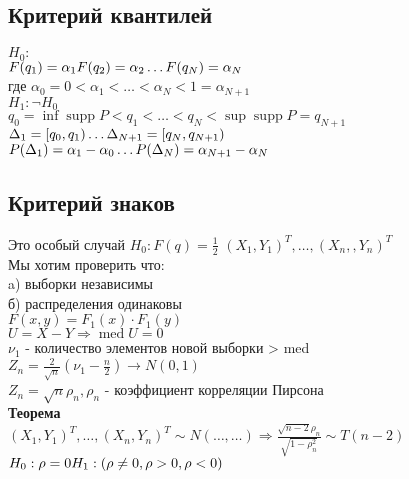 \documentclass{article}
\newcommand\0{\mathbb{0}}
\DeclareMathOperator{\supp}{supp}
\DeclareMathOperator{\med}{med}
\newcommand\1{\mathbb{1}}
\newcommand{\Rto}{\Rightarrow}
\begin{document}
\subsection{Критерий квантилей}
$H_0:$\\
$F(q_1) = \alpha_1\\
F(q_2) = \alpha_2\\
\dots \\
F(q_N) = \alpha_N$\\
где $\alpha_0 = 0 < \alpha_1 < \dots < \alpha_N < 1 = \alpha_{N + 1}$\\
$H_1: \neg H_0$\\
$q_0 = \inf \supp P < q_1 < \dots < q_N < \sup \supp P = q_{N + 1}$\\
$\Delta_1 = [q_0, q_1)\\
\dots\\
\Delta_{N + 1} = [q_N, q_{N + 1})$\\
$P(\Delta_1) = \alpha_1 - \alpha_0\\
\dots\\
P(\Delta_N) = \alpha_{N + 1} - \alpha_N$\\
\subsection{Критерий знаков}
Это особый случай $H_0: F(q) = \frac{1}{2}$
$(X_1, Y_1)^T, \dots, (X_n, , Y_n)^T$\\
Мы хотим проверить что:\\
a) выборки независимы\\
б) распределения одинаковы\\
$F(x, y) = F_1(x) \cdot F_1(y)$\\
$U = X - Y \Rto \med U = 0$\\
$\nu_1$ - количество элементов новой выборки > med\\
$Z_n = \frac{2}{\sqrt{n}}(\nu_1 - \frac{n}{2}) \to N(0, 1)$\\
$Z_n = \sqrt{n} \rho_n, \rho_n$ - коэффициент корреляции Пирсона\\
\textbf{Теорема}\\
$(X_1, Y_1)^T, \dots, (X_n, Y_n)^T \sim N(\dots, \dots) \Rto \frac{\sqrt{n -2} \rho_n}{\sqrt{1 - \rho_n^2}} \sim T(n - 2)$\\
$H_0: \rho = 0\\
H_1: (\rho \neq 0, \rho > 0, \rho < 0)$
\end{document}

